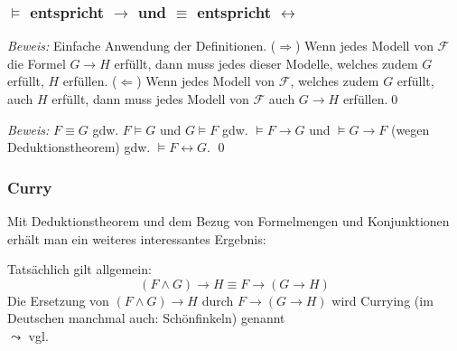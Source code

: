 \documentclass[aspectratio=1610,onlymath]{beamer}
\begin{document}
\begin{frame}\frametitle{$\models$ entspricht $\to$ und $\equiv$ entspricht $\leftrightarrow$}

\pause

\emph{Beweis:} Einfache Anwendung der Definitionen.
($\Rightarrow$) Wenn jedes Modell von $\mathcal{F}$ die Formel $G\to H$ erfüllt, 
dann muss jedes dieser Modelle, welches zudem $G$ erfüllt, $H$ erfüllen.  ($\Leftarrow$) Wenn jedes Modell von $\mathcal{F}$, welches zudem $G$ erfüllt, auch $H$ erfüllt, dann muss jedes Modell von $\mathcal{F}$ auch $G\to H$ erfüllen.\qed\medskip\pause


\pause

\emph{Beweis:} $F\equiv G$ \alert{gdw.} $F\models G$ und $G\models F$ \alert{gdw.} $\models F\to G$ und $\models G\to F$ (wegen Deduktionstheorem) \alert{gdw.} $\models F\leftrightarrow G$. \qed

\end{frame}

\begin{frame}\frametitle{Curry}

Mit Deduktionstheorem und dem Bezug von Formelmengen und Konjunktionen erhält man ein weiteres interessantes
Ergebnis:\medskip

\medskip\pause

Tatsächlich gilt allgemein:
% 
\[ (F\wedge G)\to H\equiv F\to (G\to H)\]
% 
Die Ersetzung von $(F\wedge G)\to H$ durch $F\to (G\to H)$ wird \alert{Currying} (im Deutschen manchmal
auch: \alert{Schönfinkeln}) genannt\\
$\leadsto$ vgl. 

\end{frame}
\end{document}

